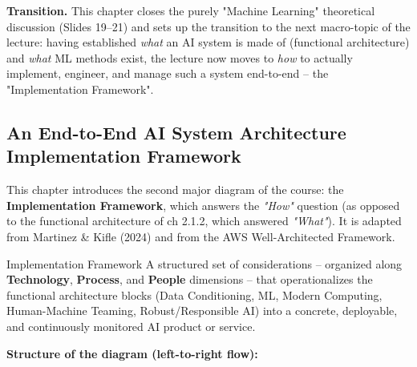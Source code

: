 \textbf{Transition.} This chapter closes the purely "Machine Learning" theoretical discussion (Slides 19--21) and sets up the transition to the next macro-topic of the lecture: having established \emph{what} an AI system is made of (functional architecture) and \emph{what} ML methods exist, the lecture now moves to \emph{how} to actually implement, engineer, and manage such a system end-to-end -- the "Implementation Framework".

\subsection{ An End-to-End AI System Architecture Implementation Framework}

This chapter introduces the second major diagram of the course: the \textbf{Implementation Framework}, which answers the \emph{"How"} question (as opposed to the functional architecture of ch 2.1.2, which answered \emph{"What"}). It is adapted from Martinez \& Kifle (2024) and from the AWS Well-Architected Framework.

\begin{defbox}{Implementation Framework}
A structured set of considerations -- organized along \textbf{Technology}, \textbf{Process}, and \textbf{People} dimensions -- that operationalizes the functional architecture blocks (Data Conditioning, ML, Modern Computing, Human-Machine Teaming, Robust/Responsible AI) into a concrete, deployable, and continuously monitored AI product or service.
\end{defbox}

\textbf{Structure of the diagram (left-to-right flow):}

